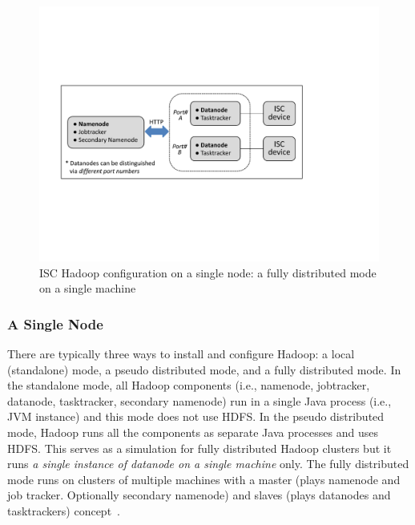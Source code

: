 \begin{figure}[htbp]
	\centering
		\includegraphics[width=1.0\columnwidth]{figures/Single_node_architecture.pdf}
	\caption{ISC Hadoop configuration on a single node: a fully distributed mode on a single machine}
	\label{fig:ISC_single_node_config}
\end{figure}

\subsubsection{A Single Node}\label{subsubsec:singlenode}
There are typically three ways to install and configure Hadoop: a local (standalone) mode, a pseudo distributed mode, and a fully distributed mode. In the standalone mode, all Hadoop components (i.e., namenode, jobtracker, datanode, tasktracker, secondary namenode) run in a single Java process (i.e., JVM instance) and this mode does not use HDFS. In the pseudo distributed mode, Hadoop runs all the components as separate Java processes and uses HDFS. This serves as a simulation for fully distributed Hadoop clusters but it runs \emph{a single instance of datanode on a single machine} only. The fully distributed mode runs on clusters of multiple machines with a master (plays namenode and job tracker. Optionally secondary namenode) and slaves (plays datanodes and tasktrackers) concept~\cite{MapReduce:Tutorial}. 

